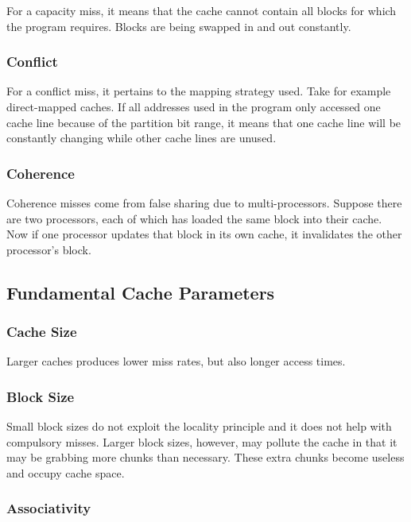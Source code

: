 \documentclass[11pt]{article}
\begin{document}
For a capacity miss, it means that the cache cannot contain all blocks for which the program requires. Blocks are being swapped in and out constantly.

\subsubsection{Conflict}

For a conflict miss, it pertains to the mapping strategy used. Take for example direct-mapped caches. If all addresses used in the program only accessed one cache line because of the partition bit range, it means that one cache line will be constantly changing while other cache lines are unused.

\subsubsection{Coherence}

Coherence misses come from false sharing due to multi-processors. Suppose there are two processors, each of which has loaded the same block into their cache. Now if one processor updates that block in its own cache, it invalidates the other processor's block. 

\subsection{Fundamental Cache Parameters}

\subsubsection{Cache Size}

Larger caches produces lower miss rates, but also longer access times.

\subsubsection{Block Size}

Small block sizes do not exploit the locality principle and it does not help with compulsory misses.  Larger block sizes, however, may pollute the cache in that it may be grabbing more chunks than necessary. These extra chunks become useless and occupy cache space.

\subsubsection{Associativity}
\end{document}
